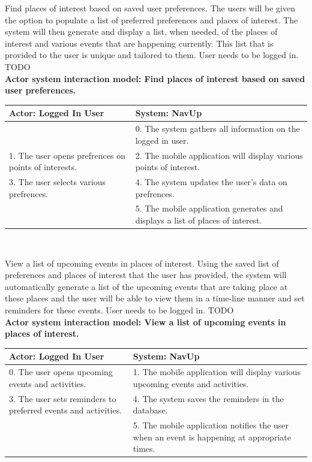 \FuncReq
{Find places of interest based on saved user preferences.}
{The users will be given the option to populate a list of preferred preferences and places of interest. The system will then generate and display a list, when needed, of the  places of interest and various events that are happening currently. This list that is provided to the user is unique and tailored to them.}
{User needs to be logged in.}
{TODO}
\\
    \textbf{Actor system interaction model: Find places of interest based on saved user preferences. }\\
    \begin{tabular}{ | p{6cm} | p{6cm} |}
    \hline
    Actor: Logged In User & System: NavUp \\ \hline
    & 0. The system gathers all information on the logged in user.\\ \hline
    1. The user opens prefrences on points of interests. & 2. The mobile application will display various points of interest.\\ \hline
    3. The user selects various prefrences. & 4. The system updates the user's data on prefrences. \\ \hline
    & 5. The mobile application generates and displays a list of places of interest. \\ \hline
    \end{tabular}
\\
\bigskip

\FuncReq
{View a list of upcoming events in places of interest.}
{Using the saved list of preferences and places of interest that the user has provided, the system will automatically generate a list of the upcoming events that are taking place at these places and the user will be able to view them in a time-line manner and set reminders for these events.}
{User needs to be logged in.}
{TODO}
\\
    \textbf{Actor system interaction model: View a list of upcoming events in places of interest. }\\
    \begin{tabular}{ | p{6cm} | p{6cm} |}
    \hline
    Actor: Logged In User & System: NavUp \\ \hline
    0. The user opens upcoming events and activities. & 1. The mobile application will display various upcoming events and activities.\\ \hline
    3. The user sets reminders to preferred events and activities. & 4. The system saves the reminders in the database. \\ \hline
    & 5. The mobile application notifies the user when an event is happening at appropriate times. \\ \hline
    \end{tabular}
\\
\bigskip

